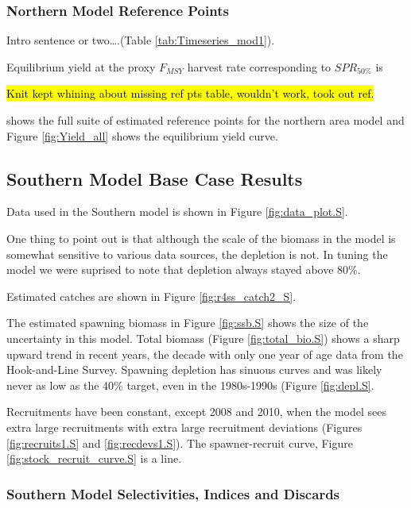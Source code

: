 \documentclass[12pt,]{article}
\begin{document}
\subsubsection{Northern Model Reference
Points}\label{northern-model-reference-points}

Intro sentence or two\ldots{}.(Table \ref{tab:Timeseries_mod1}).

Equilibrium yield at the proxy \(F_{MSY}\) harvest rate corresponding to
\(SPR_{50\%}\) is

\hl{Knit kept whining about missing ref pts table, wouldn't work, took out ref.}

shows the full suite of estimated reference points for the northern area
model and Figure \ref{fig:Yield_all} shows the equilibrium yield curve.

\clearpage

\subsection{Southern Model Base Case
Results}\label{southern-model-base-case-results}

Data used in the Southern model is shown in Figure
\ref{fig:data_plot.S}.

One thing to point out is that although the scale of the biomass in the
model is somewhat sensitive to various data sources, the depletion is
not. In tuning the model we were suprised to note that depletion always
stayed above 80\%.

Estimated catches are shown in Figure \ref{fig:r4ss_catch2_S}.

The estimated spawning biomass in Figure \ref{fig:ssb.S} shows the size
of the uncertainty in this model. Total biomass (Figure
\ref{fig:total_bio.S}) shows a sharp upward trend in recent years, the
decade with only one year of age data from the Hook-and-Line Survey.
Spawning depletion has sinuous curves and was likely never as low as the
40\% target, even in the 1980s-1990s (Figure \ref{fig:depl.S}.

Recruitments have been constant, except 2008 and 2010, when the model
sees extra large recruitments with extra large recruitment deviations
(Figures \ref{fig:recruits1.S} and \ref{fig:recdevs1.S}). The
spawner-recruit curve, Figure \ref{fig:stock_recruit_curve.S} is a line.

\subsubsection{Southern Model Selectivities, Indices and
Discards}\label{southern-model-selectivities-indices-and-discards}
\end{document}
